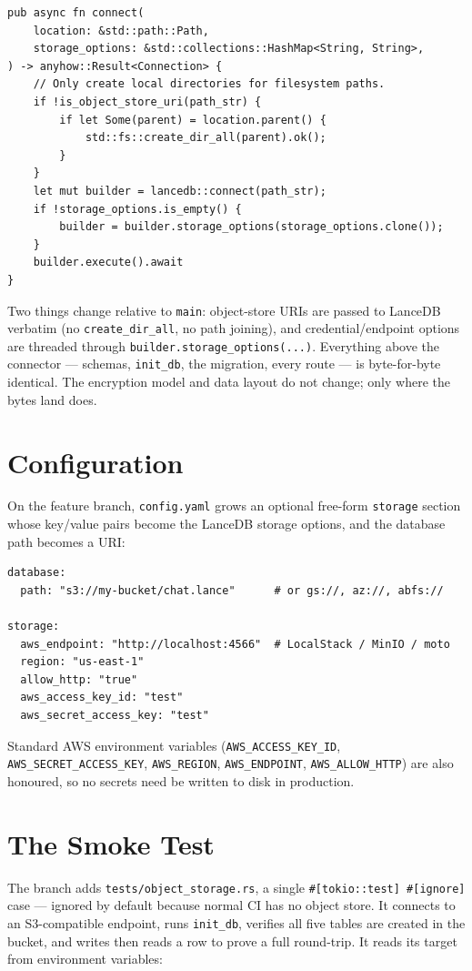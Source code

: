 \begin{lstlisting}
pub async fn connect(
    location: &std::path::Path,
    storage_options: &std::collections::HashMap<String, String>,
) -> anyhow::Result<Connection> {
    // Only create local directories for filesystem paths.
    if !is_object_store_uri(path_str) {
        if let Some(parent) = location.parent() {
            std::fs::create_dir_all(parent).ok();
        }
    }
    let mut builder = lancedb::connect(path_str);
    if !storage_options.is_empty() {
        builder = builder.storage_options(storage_options.clone());
    }
    builder.execute().await
}
\end{lstlisting}

Two things change relative to \verb|main|: object-store URIs are passed to
LanceDB verbatim (no \verb|create_dir_all|, no path joining), and
credential/endpoint options are threaded through
\verb|builder.storage_options(...)|. Everything above the connector --- schemas,
\verb|init_db|, the migration, every route --- is byte-for-byte identical. The
encryption model and data layout do not change; only where the bytes land does.

\section{Configuration}

On the feature branch, \verb|config.yaml| grows an optional free-form
\verb|storage| section whose key/value pairs become the LanceDB storage options,
and the database path becomes a URI:

\begin{lstlisting}
database:
  path: "s3://my-bucket/chat.lance"      # or gs://, az://, abfs://

storage:
  aws_endpoint: "http://localhost:4566"  # LocalStack / MinIO / moto
  region: "us-east-1"
  allow_http: "true"
  aws_access_key_id: "test"
  aws_secret_access_key: "test"
\end{lstlisting}

Standard AWS environment variables (\verb|AWS_ACCESS_KEY_ID|,
\verb|AWS_SECRET_ACCESS_KEY|, \verb|AWS_REGION|, \verb|AWS_ENDPOINT|,
\verb|AWS_ALLOW_HTTP|) are also honoured, so no secrets need be written to disk in
production.

\section{The Smoke Test}

The branch adds \verb|tests/object_storage.rs|, a single
\verb|#[tokio::test] #[ignore]| case --- ignored by default because normal CI has
no object store. It connects to an S3-compatible endpoint, runs \verb|init_db|,
verifies all five tables are created in the bucket, and writes then reads a row
to prove a full round-trip. It reads its target from environment variables:

